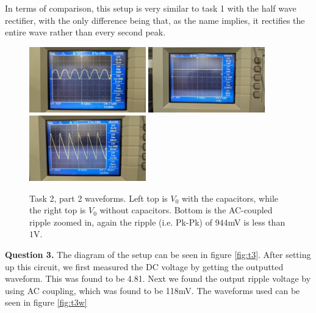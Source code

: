 \documentclass[letterpaper, reqno,11pt]{article}
\begin{document}
In terms of comparison, this setup is very similar to task 1 with the half wave rectifier, with the only difference being that, as the name implies, it rectifies the entire wave rather than every second peak.

\begin{figure}[htpb]
        \centering
        \includegraphics[width=0.45\textwidth]{lab1/t2p2a}
        \includegraphics[width=0.45\textwidth]{lab1/t2p2b}
        \includegraphics[width=0.45\textwidth]{lab1/t2p2c}
        \caption{Task 2, part 2 waveforms. Left top is $V_0$ with the capacitors, while the right top is $V_0$ without capacitors. Bottom is the AC-coupled ripple zoomed in, again the ripple (i.e. Pk-Pk) of $944$mV is less than $1$V.}
        \label{fig:t2p2}
\end{figure}

{\medskip\noindent\bf Question 3.} The diagram of the setup can be seen in figure \ref{fig:t3}. After setting up this circuit, we first measured the DC voltage by getting the outputted waveform. This was found to be 4.81. Next we found the output ripple voltage by using AC coupling, which was found to be 118mV. The waveforms used can be seen in figure \ref{fig:t3w}
\end{document}
